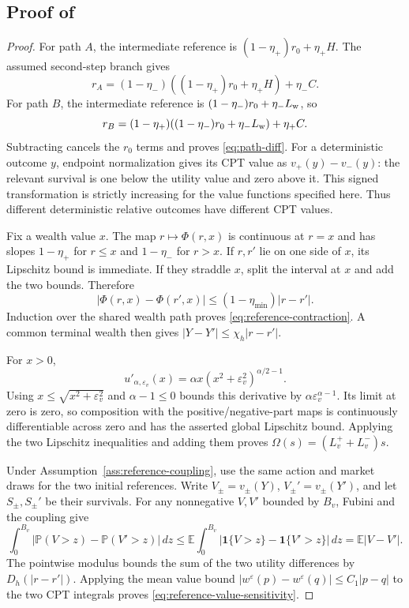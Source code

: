 \documentclass[11pt]{article}
\newcommand{\E}{\mathbb E}
\newcommand{\Pp}{\mathbb P}
\newcommand{\1}{\mathbf 1}
\newcommand{\eps}{\varepsilon}
\begin{document}
\subsection{Proof of \texorpdfstring{}{the reference proposition}}
\begin{proof}
For path $A$, the intermediate reference is $(1-\eta_+)r_0+\eta_+H$. The assumed second-step branch gives
\[
 r_A=(1-\eta_-)((1-\eta_+)r_0+\eta_+H)+\eta_-C.
\]
For path $B$, the intermediate reference is $(1-\eta_-)r_0+\eta_-L_{\rm w}$, so
\[
 r_B=(1-\eta_+)((1-\eta_-)r_0+\eta_-L_{\rm w})+\eta_+C.
\]
Subtracting cancels the $r_0$ terms and proves \eqref{eq:path-diff}. For a deterministic outcome $y$, endpoint normalization gives its CPT value as $v_+(y)-v_-(y)$: the relevant survival is one below the utility value and zero above it. This signed transformation is strictly increasing for the value functions specified here. Thus different deterministic relative outcomes have different CPT values.

Fix a wealth value $x$. The map $r\mapsto\Phi(r,x)$ is continuous at $r=x$ and has slopes $1-\eta_+$ for $r\le x$ and $1-\eta_-$ for $r>x$. If $r,r'$ lie on one side of $x$, its Lipschitz bound is immediate. If they straddle $x$, split the interval at $x$ and add the two bounds. Therefore
\[
 |\Phi(r,x)-\Phi(r',x)|\le(1-\eta_{\min})|r-r'|.
\]
Induction over the shared wealth path proves \eqref{eq:reference-contraction}. A common terminal wealth then gives $|Y-Y'|\le\chi_h|r-r'|$.

For $x>0$,
\[
 u'_{\alpha,\eps_v}(x)=\alpha x(x^2+\eps_v^2)^{\alpha/2-1}.
\]
Using $x\le\sqrt{x^2+\eps_v^2}$ and $\alpha-1\le0$ bounds this derivative by $\alpha\eps_v^{\alpha-1}$. Its limit at zero is zero, so composition with the positive/negative-part maps is continuously differentiable across zero and has the asserted global Lipschitz bound. Applying the two Lipschitz inequalities and adding them proves $\Omega(s)=(L_v^++L_v^-)s$.

Under Assumption~\ref{ass:reference-coupling}, use the same action and market draws for the two initial references. Write $V_\pm=v_\pm(Y)$, $V_\pm'=v_\pm(Y')$, and let $S_\pm,S_\pm'$ be their survivals. For any nonnegative $V,V'$ bounded by $B_v$, Fubini and the coupling give
\begin{equation}\label{eq:survival-coupling-inequality}
 \int_0^{B_v}|\Pp(V>z)-\Pp(V'>z)|\,dz
 \le \E\int_0^{B_v}|\1\{V>z\}-\1\{V'>z\}|\,dz
 =\E|V-V'|.
\end{equation}
The pointwise modulus bounds the sum of the two utility differences by $D_h(|r-r'|)$. Applying the mean value bound $|w^\eps(p)-w^\eps(q)|\le C_1|p-q|$ to the two CPT integrals proves \eqref{eq:reference-value-sensitivity}.


\end{proof}
\end{document}
